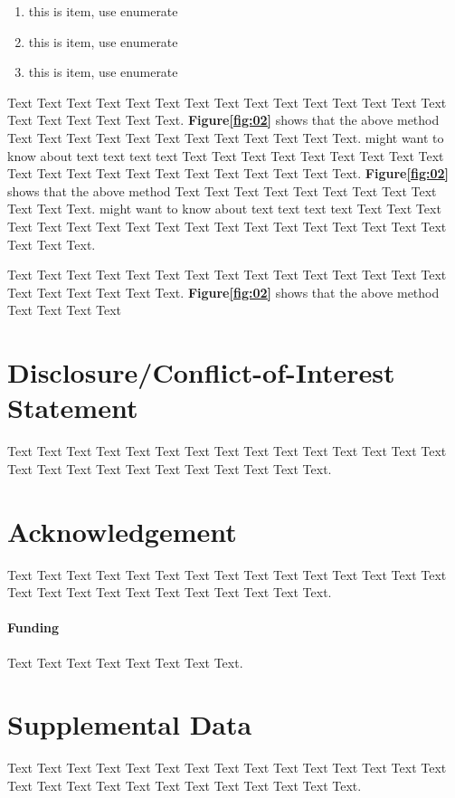 \documentclass{bioinfo}
\begin{document}
\begin{enumerate}
\item this is item, use enumerate
\item this is item, use enumerate
\item this is item, use enumerate
\end{enumerate}

Text Text Text Text Text Text  Text Text Text Text Text Text Text Text Text  Text Text Text Text Text Text. \textbf{Figure\ref{fig:02}} shows that the above method  Text Text Text Text  Text Text Text Text Text Text  Text Text.  \citealp{Boffelli03} might want to know about  text text text text
Text Text Text Text Text Text  Text Text Text Text Text Text Text Text Text  Text Text Text Text Text Text. \textbf{Figure\ref{fig:02}} shows that the above method  Text Text Text Text  Text Text Text Text Text Text  Text Text.  \citealp{Boffelli03} might want to know about  text text text text
Text Text Text Text Text Text  Text Text Text Text Text Text Text Text Text  Text Text Text Text Text Text.

Text Text Text Text Text Text  Text Text Text Text Text Text Text Text Text  Text Text Text Text Text Text. \textbf{Figure\ref{fig:02}} shows that the above method  Text Text Text Text

\section*{Disclosure/Conflict-of-Interest Statement}
Text Text Text Text Text Text  Text Text Text Text Text Text Text Text  Text Text Text Text Text Text Text Text Text  Text Text Text.

\section*{Acknowledgement}
Text Text Text Text Text Text  Text Text Text Text Text Text Text Text  Text Text Text Text Text Text Text Text Text  Text Text Text.  

\paragraph{Funding\textcolon} Text Text Text Text Text Text  Text Text.

\section*{Supplemental Data}
Text Text Text Text Text Text  Text Text Text Text Text Text Text Text Text  Text Text Text Text Text Text Text Text Text  Text Text Text.
\end{document}
